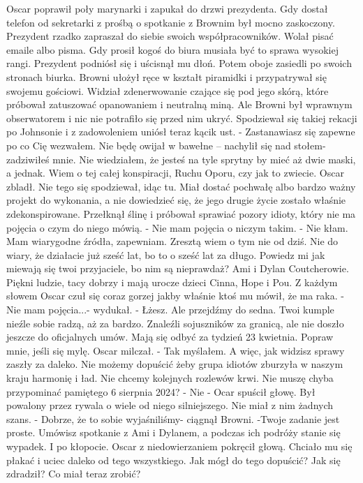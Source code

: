 \documentclass[12pt,a4paper]{book}
\begin{document}
Oscar poprawił poły marynarki i zapukał do drzwi prezydenta. Gdy dostał telefon od sekretarki z prośbą o spotkanie z Brownim był mocno zaskoczony. Prezydent rzadko zapraszał do siebie swoich współpracowników. Wolał pisać emaile albo pisma. Gdy prosił kogoś do biura musiała być to sprawa wysokiej rangi. 
Prezydent podniósł się i uścisnął mu dłoń. Potem oboje zasiedli po swoich stronach biurka. Browni ułożył ręce w kształt piramidki i przypatrywał się swojemu gościowi. Widział zdenerwowanie czające się pod jego skórą, które próbował zatuszować opanowaniem i neutralną miną. Ale Browni był wprawnym obserwatorem i nic nie potrafiło się przed nim ukryć. Spodziewał się takiej rekacji po Johnsonie i z zadowoleniem uniósł teraz kącik ust. 
- Zastanawiasz się zapewne po co Cię wezwałem. Nie będę owijał w bawełne – nachylił się nad stołem- zadziwiłeś mnie. Nie wiedziałem, że jesteś na tyle sprytny by mieć aż dwie maski, a jednak. Wiem o tej całej konspiracji, Ruchu Oporu, czy jak to zwiecie. 
Oscar zbladł. Nie tego się spodziewał, idąc tu. Miał dostać pochwałę albo bardzo ważny projekt do wykonania, a nie dowiedzieć się, że jego drugie życie zostało właśnie zdekonspirowane. 
Przełknął ślinę i próbował sprawiać pozory idioty, który nie ma pojęcia o czym do niego mówią. 
- Nie mam pojęcia o niczym takim. 
- Nie kłam. Mam wiarygodne źródła, zapewniam. Zresztą wiem o tym nie od dziś. Nie do wiary, że działacie już sześć lat, bo to o sześć lat za długo. Powiedz mi jak miewają się twoi przyjaciele, bo nim są nieprawdaż? Ami i Dylan Coutcherowie. Piękni ludzie, tacy dobrzy i mają urocze dzieci Cinna, Hope i Pou. 
Z każdym słowem Oscar czuł się coraz gorzej jakby właśnie ktoś mu mówił, że ma raka. 
- Nie mam pojęcia...- wydukał.
- Łżesz. Ale przejdźmy do sedna. Twoi kumple nieźle sobie radzą, aż za bardzo. Znaleźli sojuszników za granicą, ale nie doszło jeszcze do oficjalnych umów. Mają się odbyć za tydzień 23 kwietnia. Popraw mnie, jeśli się mylę. 
Oscar milczał.
- Tak myślałem. A więc, jak widzisz sprawy zaszły za daleko. Nie możemy dopuścić żeby grupa idiotów zburzyła w naszym kraju harmonię i ład. Nie chcemy kolejnych rozlewów krwi. Nie muszę chyba przypominać pamiętego 6 sierpnia 2024?
- Nie - Ocar spuścił głowę. 
Był powalony przez rywala o wiele od niego silniejszego. Nie miał z nim żadnych szans. 
- Dobrze, że to sobie wyjaśniliśmy- ciągnął Browni. -Twoje zadanie jest proste. Umówisz spotkanie z Ami i Dylanem, a podczas ich podróży stanie się wypadek. I po kłopocie. 
Oscar z niedowierzaniem pokręcił głową. Chciało mu się płakać i uciec daleko od tego wszystkiego. Jak mógł do tego dopuścić? Jak się zdradził? Co miał teraz zrobić?
\end{document}
